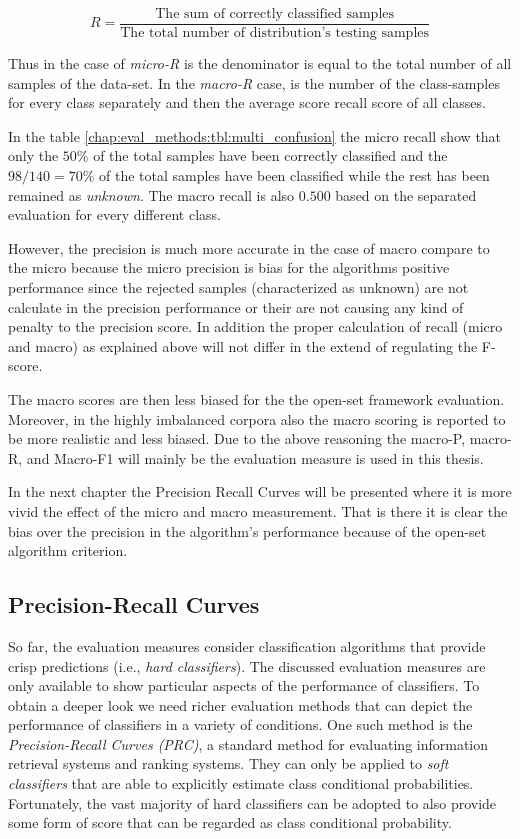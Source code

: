 \begin{equation}\label{chap:eval_methods:eq:recall_theory}
	R = \frac {\text{The sum of correctly classified samples}} {\text{The total number of distribution's testing samples}}
\end{equation}

Thus in the case of \textit{micro-R} is the denominator is equal to the total number of all samples of the data-set. In the \textit{macro-R} case, is the number of the class-samples for every class separately and then the average score recall score of all classes.

In the table \ref{chap:eval_methods:tbl:multi_confusion} the micro recall show that only the $50\%$ of the total samples have been correctly classified and the $98/140 = 70\%$ of the total samples have been classified while the rest has been remained as \textit{unknown}. The macro recall is also $0.500$ based on the separated evaluation for every different class.

However, the precision is much more accurate in the case of macro compare to the micro because the micro precision is bias for the algorithms positive performance since the rejected samples (characterized as unknown) are not calculate in the precision performance or their are not causing any kind of penalty to the precision score. In addition the proper calculation of recall (micro and macro) as explained above will not differ in the extend of regulating the F-score.

The macro scores are then less biased for the the open-set framework evaluation. Moreover, in the highly imbalanced corpora also the macro scoring is reported to be more realistic and less biased. Due to the above reasoning the macro-P, macro-R, and Macro-F1 will mainly be the evaluation measure is used in this thesis.

In the next chapter the Precision Recall Curves will be presented where it is more vivid the effect of the micro and macro measurement. That is there it is clear the bias over the precision in the algorithm's performance because of the open-set algorithm criterion.


\subsection{Precision-Recall Curves}\label{chap:eval_methods:sec:roc_prc}

So far, the evaluation measures consider classification algorithms that provide crisp predictions (i.e., \textit{hard classifiers}). The discussed evaluation measures are only available to show particular aspects of the performance of classifiers. To obtain a deeper look we need richer evaluation methods that can depict the performance of classifiers in a variety of conditions. One such method is the \textit{Precision-Recall Curves (PRC)}, a standard method for evaluating information retrieval systems and ranking systems. They can only be applied to \textit{soft classifiers} that are able to explicitly estimate class conditional probabilities. Fortunately, the vast majority of hard classifiers can be adopted to also provide some form of score that can be regarded as class conditional probability.

